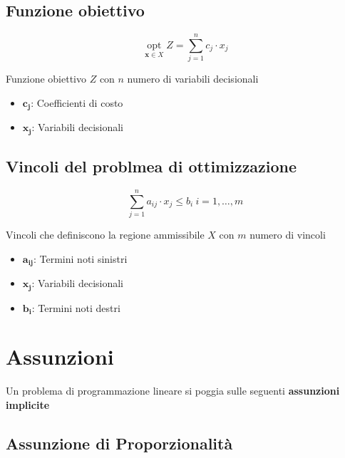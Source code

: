 \subsection{Funzione obiettivo}
\begin{minipage}{0.45\textwidth}
    {
        \Large
    
        $$
            \operatorname*{opt}_{\mathbf{x} \in X} Z = \sum_{j=1}^{n} c_j \cdot x_j
        $$
    }
\end{minipage}
\hfil
\begin{minipage}{0.45\textwidth}
    Funzione obiettivo $Z$ con $n$ numero di variabili decisionali
    \begin{itemize}
        \item $\mathbf{c_j}$: Coefficienti di costo
        \item $\mathbf{x_j}$: Variabili decisionali
    \end{itemize}
\end{minipage}

\subsection{Vincoli del problmea di ottimizzazione}
\begin{minipage}{0.45\textwidth}
{
    \Large

    $$
        \sum_{j=1}^{n} a_{ij} \cdot x_j \leq b_i \ i=1,\dots,m
    $$
}
\end{minipage}
\hfil
\begin{minipage}{0.45\textwidth}
    Vincoli che definiscono la regione ammissibile $X$ con $m$ numero di vincoli

    \begin{itemize}
        \item $\mathbf{a_{ij}}$: Termini noti sinistri
        \item $\mathbf{x_j}$: Variabili decisionali
        \item $\mathbf{b_i}$: Termini noti destri
    \end{itemize}
\end{minipage}

\section{Assunzioni}
Un problema di programmazione lineare si poggia sulle seguenti \textbf{assunzioni implicite}

\subsection{Assunzione di Proporzionalità}

